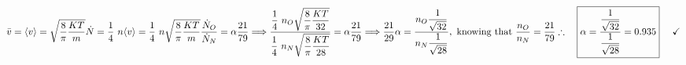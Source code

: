 \documentclass[fleqn]{article}
\begin{document}
\begin{enumerate}
        \textcolor{hwColor}{
          \\
          $
            \bar{v}=\langle v \rangle=\sqrt{\dfrac{8}{\pi} \dfrac{ K T }{m}}
            \\
            \\
            \\
            \dot{N}=\dfrac{1}{4} ~ n \langle v \rangle=\dfrac{1}{4} ~ n \sqrt{\dfrac{8}{\pi} \dfrac{ K T }{m}}
            \\
            \\
            \\
            \dfrac{\dot{N}_O}{\dot{N}_N}=\alpha \dfrac{21}{79}
            \Longrightarrow
            \dfrac{
              \dfrac{1}{4} ~ n_O \sqrt{\dfrac{8}{\pi} \dfrac{ K T }{32}}
            }{
              \dfrac{1}{4} ~ n_N \sqrt{\dfrac{8}{\pi} \dfrac{ K T }{28}}
            }=\alpha \dfrac{21}{79}
            \Longrightarrow \dfrac{21}{29} \alpha =\dfrac{
              n_O \dfrac{1}{\sqrt{32}}
            }{
              n_N \dfrac{1}{\sqrt{28}}
            }, \text{ knowing that } \dfrac{n_O}{n_N}=\dfrac{21}{79}
            \\
            \\
            \\
            \therefore ~~~ \boxed{
              \alpha=\dfrac{\dfrac{1}{\sqrt{32}}}{\dfrac{1}{\sqrt{28}}}=0.935
            } ~~~~ \checkmark
          $
        }

  \end{enumerate}
\end{document}
